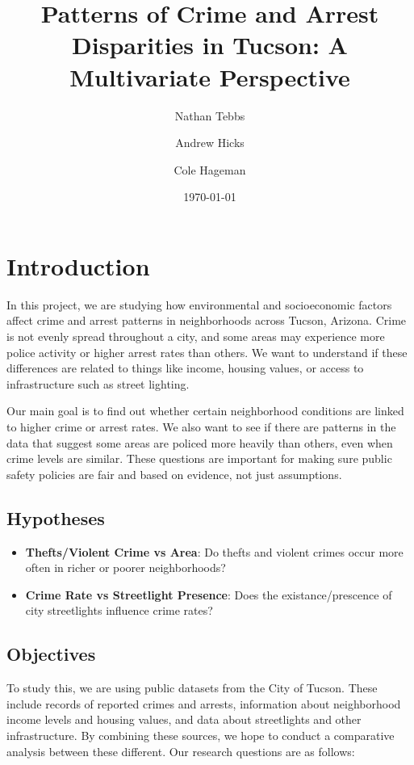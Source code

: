 \documentclass{report}
\title{\textbf{Patterns of Crime and Arrest Disparities in Tucson: A Multivariate Perspective}}
\author{Nathan Tebbs \and Andrew Hicks \and Cole Hageman}
\date{\today}
\begin{document}
\maketitle
\tableofcontents


\chapter{Introduction}

In this project, we are studying how environmental and socioeconomic factors affect crime and arrest patterns in neighborhoods across Tucson, Arizona. Crime is not evenly spread throughout a city, and some areas may experience more police activity or higher arrest rates than others. We want to understand if these differences are related to things like income, housing values, or access to infrastructure such as street lighting.

Our main goal is to find out whether certain neighborhood conditions are linked to higher crime or arrest rates. We also want to see if there are patterns in the data that suggest some areas are policed more heavily than others, even when crime levels are similar. These questions are important for making sure public safety policies are fair and based on evidence, not just assumptions.

\section{Hypotheses}
\begin{itemize}
\item \textbf{Thefts/Violent Crime vs Area}: Do thefts and violent crimes occur more often in richer or poorer neighborhoods?
\item \textbf{Crime Rate vs Streetlight Presence}: Does the existance/prescence of city streetlights influence crime rates?
\end{itemize}

\newpage
\section{Objectives}

To study this, we are using public datasets from the City of Tucson. These include records of reported crimes and arrests, information about neighborhood income levels and housing values, and data about streetlights and other infrastructure. By combining these sources, we hope to conduct a comparative analysis between these different. Our research questions are as follows:
\end{document}
